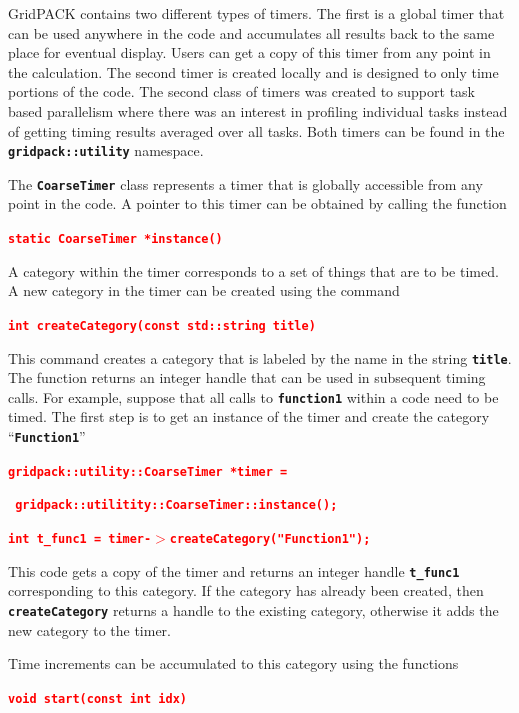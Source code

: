 \documentclass[12pt]{report} %
\begin{document}
GridPACK contains two different types of timers. The first is a global timer that can be used anywhere in the code and accumulates all results back to the same place for eventual display. Users can get a copy of this timer from any point in the calculation. The second timer is created locally and is designed to only time portions of the code. The second class of timers was created to support task based parallelism where there was an interest in profiling individual tasks instead of getting timing results averaged over all tasks. Both timers can be found in the \texttt{\textbf{gridpack::utility}} namespace.

The \texttt{\textbf{CoarseTimer}} class represents a timer that is globally accessible from any point in the code. A pointer to this timer can be obtained by calling the function

\textcolor{red}{\texttt{\textbf{static CoarseTimer *instance()}}}

A category within the timer corresponds to a set of things that are to be timed. A new category in the timer can be created using the command

\textcolor{red}{\texttt{\textbf{int createCategory(const std::string title)}}}

This command creates a category that is labeled by the name in the string \texttt{\textbf{title}}. The function returns an integer handle that can be used in subsequent timing calls. For example, suppose that all calls to \texttt{\textbf{function1}} within a code need to be timed. The first step is to get an instance of the timer and create the category ``\texttt{\textbf{Function1}}''

\textcolor{red}{\texttt{\textbf{gridpack::utility::CoarseTimer *timer =}}}

\textcolor{red}{\texttt{\textbf{  gridpack::utilitity::CoarseTimer::instance();}}}

\textcolor{red}{\texttt{\textbf{int t\_func1 = timer-$\boldsymbol{\mathrm{>}}$createCategory("Function1");}}}

This code gets a copy of the timer and returns an integer handle \texttt{\textbf{t\_func1}} corresponding to this category. If the category has already been created, then \texttt{\textbf{createCategory}} returns a handle to the existing category, otherwise it adds the new category to the timer.

Time increments can be accumulated to this category using the functions

\textcolor{red}{\texttt{\textbf{void start(const int idx)}}}
\end{document}
